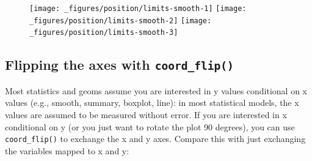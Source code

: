 \begin{Shaded}
\begin{Highlighting}[]
\StringTok{ }\OperatorTok{+}\StringTok{ }
\StringTok{  }\NormalTok{() }\OperatorTok{+}\StringTok{ }
\StringTok{  }\NormalTok{()}

\OperatorTok{+}\StringTok{ }\NormalTok{(} \NormalTok{(}\NormalTok{, }\NormalTok{))}
\OperatorTok{+}\StringTok{ }\NormalTok{(} \NormalTok{(}\NormalTok{, }\NormalTok{))}
\end{Highlighting}
\end{Shaded}

\begin{figure}[H]
  \texttt{[image: \_figures/position/limits-smooth-1]}%
  \texttt{[image: \_figures/position/limits-smooth-2]}%
  \texttt{[image: \_figures/position/limits-smooth-3]}
\end{figure}

\hypertarget{flipping-the-axes-with-coord_flip}{%
\subsection{\texorpdfstring{Flipping the axes with
\texttt{coord\_flip()}}{Flipping the axes with coord\_flip()}}\label{flipping-the-axes-with-coord_flip}}

\label{sub:coord-flip}

Most statistics and geoms assume you are interested in y values
conditional on x values (e.g., smooth, summary, boxplot, line): in most
statistical models, the x values are assumed to be measured without
error. If you are interested in x conditional on y (or you just want to
rotate the plot 90 degrees), you can use \texttt{coord\_flip()} to
exchange the x and y axes. Compare this with just exchanging the
variables mapped to x and y: 
 

